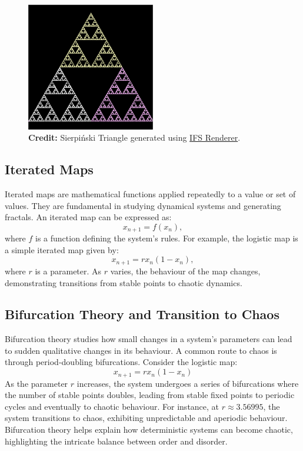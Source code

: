 \documentclass[12pt]{article}
\begin{document}
\begin{figure}[H]
\centering
\includegraphics[width=0.5\textwidth]{assets/sierpinski-triangle.png}
\caption{\textbf{Credit:} Sierpiński Triangle generated using \href{https://cs.lmu.edu/~ray/notes/ifs/}{IFS Renderer}.}
\label{fig:sierpinski}
\end{figure}

\subsection{Iterated Maps}
Iterated maps are mathematical functions applied repeatedly to a value or set of values. They are fundamental in studying dynamical systems and generating fractals. An iterated map can be expressed as:
\[
x_{n+1} = f(x_n),
\]
where \( f \) is a function defining the system's rules. For example, the logistic map is a simple iterated map given by:
\[
x_{n+1} = r x_n (1 - x_n),
\]
where \( r \) is a parameter. As \( r \) varies, the behaviour of the map changes, demonstrating transitions from stable points to chaotic dynamics. 

\subsection{Bifurcation Theory and Transition to Chaos}
Bifurcation theory studies how small changes in a system's parameters can lead to sudden qualitative changes in its behaviour. A common route to chaos is through period-doubling bifurcations. Consider the logistic map:
\[
x_{n+1} = r x_n (1 - x_n)
\]
As the parameter \( r \) increases, the system undergoes a series of bifurcations where the number of stable points doubles, leading from stable fixed points to periodic cycles and eventually to chaotic behaviour. For instance, at \( r \approx 3.56995 \), the system transitions to chaos, exhibiting unpredictable and aperiodic behaviour. Bifurcation theory helps explain how deterministic systems can become chaotic, highlighting the intricate balance between order and disorder.
\end{document}

